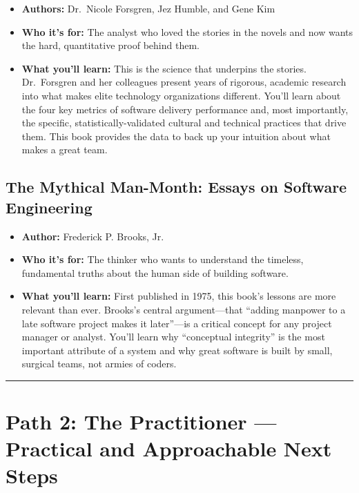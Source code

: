 \documentclass[
  letterpaper,
  DIV=11,
  numbers=noendperiod]{scrreprt}
\providecommand{\tightlist}{%
  \setlength{\itemsep}{0pt}\setlength{\parskip}{0pt}}
\begin{document}
\begin{itemize}
\tightlist
\item
  \textbf{Authors:} Dr.~Nicole Forsgren, Jez Humble, and Gene Kim
\item
  \textbf{Who it's for:} The analyst who loved the stories in the novels
  and now wants the hard, quantitative proof behind them.
\item
  \textbf{What you'll learn:} This is the science that underpins the
  stories. Dr.~Forsgren and her colleagues present years of rigorous,
  academic research into what makes elite technology organizations
  different. You'll learn about the four key metrics of software
  delivery performance and, most importantly, the specific,
  statistically-validated cultural and technical practices that drive
  them. This book provides the data to back up your intuition about what
  makes a great team.
\end{itemize}

\subsection{\texorpdfstring{\textbf{The Mythical Man-Month: Essays on
Software
Engineering}}{The Mythical Man-Month: Essays on Software Engineering}}\label{the-mythical-man-month-essays-on-software-engineering}

\begin{itemize}
\tightlist
\item
  \textbf{Author:} Frederick P. Brooks, Jr.
\item
  \textbf{Who it's for:} The thinker who wants to understand the
  timeless, fundamental truths about the human side of building
  software.
\item
  \textbf{What you'll learn:} First published in 1975, this book's
  lessons are more relevant than ever. Brooks's central argument---that
  ``adding manpower to a late software project makes it later''---is a
  critical concept for any project manager or analyst. You'll learn why
  ``conceptual integrity'' is the most important attribute of a system
  and why great software is built by small, surgical teams, not armies
  of coders.
\end{itemize}

\begin{center}\rule{0.5\linewidth}{0.5pt}\end{center}

\section{\texorpdfstring{\textbf{Path 2: The Practitioner --- Practical
and Approachable Next
Steps}}{Path 2: The Practitioner --- Practical and Approachable Next Steps}}\label{path-2-the-practitioner-practical-and-approachable-next-steps}
\end{document}
